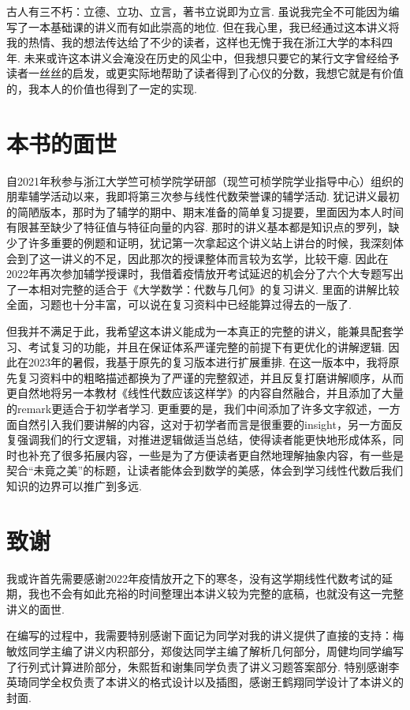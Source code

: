 古人有三不朽：立德、立功、立言，著书立说即为立言. 虽说我完全不可能因为编写了一本基础课的讲义而有如此崇高的地位. 但在我心里，我已经通过这本讲义将我的热情、我的想法传达给了不少的读者，这样也无愧于我在浙江大学的本科四年. 未来或许这本讲义会淹没在历史的风尘中，但我想只要它的某行文字曾经给予读者一丝丝的启发，或更实际地帮助了读者得到了心仪的分数，我想它就是有价值的，我本人的价值也得到了一定的实现.

\section*{本书的面世}

自2021年秋参与浙江大学竺可桢学院学研部（现竺可桢学院学业指导中心）组织的朋辈辅学活动以来，我即将第三次参与线性代数荣誉课的辅学活动. 犹记讲义最初的简陋版本，那时为了辅学的期中、期末准备的简单复习提要，里面因为本人时间有限甚至缺少了特征值与特征向量的内容. 那时的讲义基本都是知识点的罗列，缺少了许多重要的例题和证明，犹记第一次拿起这个讲义站上讲台的时候，我深刻体会到了这一讲义的不足，因此那次的授课整体而言较为玄学，比较干瘪. 因此在2022年再次参加辅学授课时，我借着疫情放开考试延迟的机会分了六个大专题写出了一本相对完整的适合于《大学数学：代数与几何》的复习讲义. 里面的讲解比较全面，习题也十分丰富，可以说在复习资料中已经能算过得去的一版了.

但我并不满足于此，我希望这本讲义能成为一本真正的完整的讲义，能兼具配套学习、考试复习的功能，并且在保证体系严谨完整的前提下有更优化的讲解逻辑. 因此在2023年的暑假，我基于原先的复习版本进行扩展重排. 在这一版本中，我将原先复习资料中的粗略描述都换为了严谨的完整叙述，并且反复打磨讲解顺序，从而更自然地将另一本教材《线性代数应该这样学》的内容自然融合，并且添加了大量的remark更适合于初学者学习. 更重要的是，我们中间添加了许多文字叙述，一方面自然引入我们要讲解的内容，这对于初学者而言是很重要的insight，另一方面反复强调我们的行文逻辑，对推进逻辑做适当总结，使得读者能更快地形成体系，同时也补充了很多拓展内容，一些是为了方便读者更自然地理解抽象内容，有一些是契合``未竟之美''的标题，让读者能体会到数学的美感，体会到学习线性代数后我们知识的边界可以推广到多远.

\section*{致谢}

我或许首先需要感谢2022年疫情放开之下的寒冬，没有这学期线性代数考试的延期，我也不会有如此充裕的时间整理出本讲义较为完整的底稿，也就没有这一完整讲义的面世.

在编写的过程中，我需要特别感谢下面记为同学对我的讲义提供了直接的支持：梅敏炫同学主编了讲义内积部分，郑俊达同学主编了解析几何部分，周健均同学编写了行列式计算进阶部分，朱熙哲和谢集同学负责了讲义习题答案部分. 特别感谢李英琦同学全权负责了本讲义的格式设计以及插图，感谢王鹤翔同学设计了本讲义的封面.

